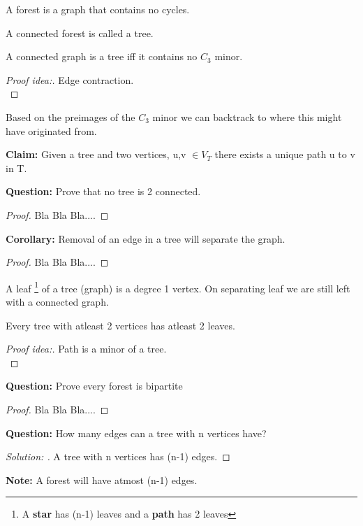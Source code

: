 \documentclass{article}
\begin{document}
\begin{definition}
    A forest is a graph that contains no cycles.
\end{definition}
\begin{definition}
    A connected forest is called a tree.
\end{definition}
\begin{theorem}
    A connected graph is a tree iff it contains no {$C_3$} minor.
\end{theorem}
\begin{proof}[Proof idea:]
    Edge contraction. \\
\end{proof}

Based on the preimages of the {$C_3$} minor we can backtrack to where this might have originated from.

\begin{text}
{\textbf{Claim:} Given a tree and two vertices, u,v $\in V_{T}$ there exists a unique path u to v in T.}   
\end{text}

\begin{text}
{\textbf {Question: }Prove that no tree is 2 connected.}
    \begin{proof}
        Bla Bla Bla....       
    \end{proof}
\end{text}
\begin{text}
{\textbf {Corollary: }Removal of an edge in a tree will separate the graph.}
    \begin{proof}
        Bla Bla Bla....       
    \end{proof}
\end{text}
\begin{definition}
A leaf \footnote{A \textbf{star} has (n-1) leaves and a \textbf{path} has 2 leaves} of a tree (graph) is a degree 1 vertex. On separating leaf we are still left with a connected graph.
\end{definition}

\begin{theorem}
    Every tree with atleast 2 vertices has atleast 2 leaves.
    \begin{proof}[Proof idea:]
        Path is a minor of a tree. \\
    \end{proof}
\end{theorem}
\begin{text}
{\textbf {Question: }Prove every forest is bipartite}
    \begin{proof}
        Bla Bla Bla....       
    \end{proof}
\end{text}
\begin{text}
{\textbf {Question: }How many edges can a tree with n vertices have?}
    \begin{proof}[Solution: ]
        A tree with n vertices has (n-1) edges.       
    \end{proof}
    {\textbf {Note: }A forest will have atmost (n-1) edges.}
    
\end{text}
\end{document}
